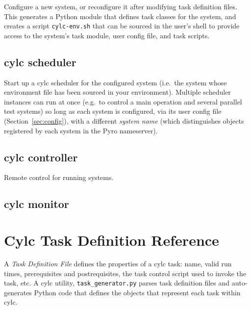 \documentclass[11pt,a4paper]{article}
\begin{document}
Configure a new system, or reconfigure it after modifying task
definition files. This generates a Python module that defines
task classes for the system, and creates a script \verb=cylc-env.sh=
that can be sourced in the user's shell to provide access to the
system's task module, user config file, and task scripts.

{ \color{Magenta}
 
}

\pagebreak
\subsection{cylc scheduler}

Start up a cylc scheduler for the configured system (i.e.\ the system
whose environment file has been sourced in your environment). Multiple
scheduler instances can run at once (e.g.\ to control a main operation
and several parallel test systems) so long as each system is configured,
via its user config file (Section~\ref{sec:config}), with a different
{\em system name} (which distinguishes objects registered by each system
in the Pyro nameserver).

{
\color{Magenta}

}



\pagebreak
\subsection{cylc controller}

Remote control for running systems.

{
\color{Magenta}

}



\pagebreak
\subsection{cylc monitor}
{
\color{Magenta}

}

\label{config}

\pagebreak
\section{Cylc Task Definition Reference}

A {\em Task Definition File} defines the properties of a cylc task:
name, valid run times, prerequisites and postrequisites, the task
control script used to invoke the task, etc.  A cylc utility,
\verb=task_generator.py= parses task definition files and auto-generates
Python code that defines the objects that represent each task within
cylc.
\end{document}
